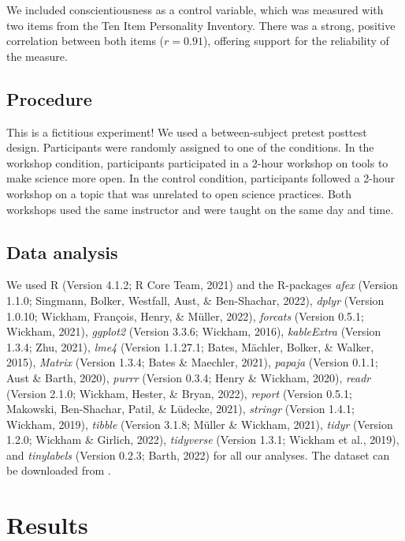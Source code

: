 \documentclass[
  man]{apa6}
\begin{document}
We included conscientiousness as a control variable, which was measured with two items from the Ten Item Personality Inventory. There was a strong, positive correlation between both items (\(r = 0.91\)), offering support for the reliability of the measure.

\hypertarget{procedure}{%
\subsection{Procedure}\label{procedure}}

This is a fictitious experiment! We used a between-subject pretest posttest design. Participants were randomly assigned to one of the conditions. In the workshop condition, participants participated in a 2-hour workshop on tools to make science more open. In the control condition, participants followed a 2-hour workshop on a topic that was unrelated to open science practices. Both workshops used the same instructor and were taught on the same day and time.

\hypertarget{data-analysis}{%
\subsection{Data analysis}\label{data-analysis}}

We used R (Version 4.1.2; R Core Team, 2021) and the R-packages \emph{afex} (Version 1.1.0; Singmann, Bolker, Westfall, Aust, \& Ben-Shachar, 2022), \emph{dplyr} (Version 1.0.10; Wickham, François, Henry, \& Müller, 2022), \emph{forcats} (Version 0.5.1; Wickham, 2021), \emph{ggplot2} (Version 3.3.6; Wickham, 2016), \emph{kableExtra} (Version 1.3.4; Zhu, 2021), \emph{lme4} (Version 1.1.27.1; Bates, Mächler, Bolker, \& Walker, 2015), \emph{Matrix} (Version 1.3.4; Bates \& Maechler, 2021), \emph{papaja} (Version 0.1.1; Aust \& Barth, 2020), \emph{purrr} (Version 0.3.4; Henry \& Wickham, 2020), \emph{readr} (Version 2.1.0; Wickham, Hester, \& Bryan, 2022), \emph{report} (Version 0.5.1; Makowski, Ben-Shachar, Patil, \& Lüdecke, 2021), \emph{stringr} (Version 1.4.1; Wickham, 2019), \emph{tibble} (Version 3.1.8; Müller \& Wickham, 2021), \emph{tidyr} (Version 1.2.0; Wickham \& Girlich, 2022), \emph{tidyverse} (Version 1.3.1; Wickham et al., 2019), and \emph{tinylabels} (Version 0.2.3; Barth, 2022) for all our analyses. The dataset can be downloaded from .

\hypertarget{results}{%
\section{Results}\label{results}}
\end{document}
